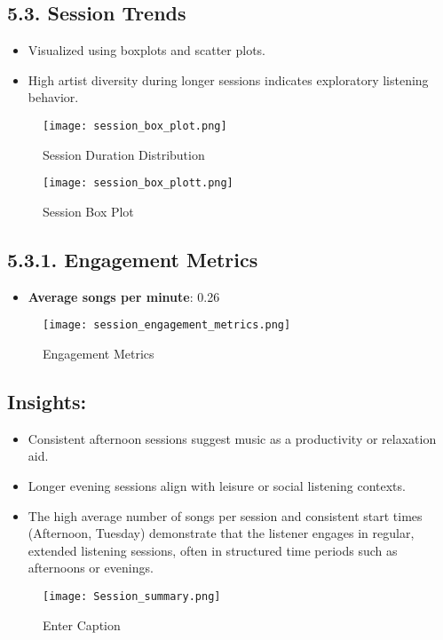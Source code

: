 \documentclass[12pt]{article}
\begin{document}
\begin{itemize}
\subsection*{5.3. Session Trends}
\begin{itemize}
    \item Visualized using boxplots and scatter plots.
    \item High artist diversity during longer sessions indicates exploratory listening behavior.
\end{itemize}
\begin{figure}[H]
    \centering
    \texttt{[image: session\_box\_plot.png]}
    \caption{Session Duration Distribution}
    \label{fig:enter-label}
\end{figure}
\begin{figure}[H]
    \centering
    \texttt{[image: session\_box\_plott.png]}
    \caption{Session Box Plot}
    \label{fig:enter-label}
\end{figure}

\subsection*{5.3.1. Engagement Metrics}
\begin{itemize}
    \item \textbf{Average songs per minute}: 0.26
\end{itemize}
\begin{figure}[H]
    \centering
    \texttt{[image: session\_engagement\_metrics.png]}
    \caption{Engagement Metrics}
    \label{fig:enter-label}
\end{figure}

\subsection*{Insights:}
\begin{itemize}
    \item Consistent afternoon sessions suggest music as a productivity or relaxation aid.
    \item Longer evening sessions align with leisure or social listening contexts.
    \item The high average number of songs per session and consistent start times (Afternoon, Tuesday) demonstrate that the listener engages in regular, extended listening sessions, often in structured time periods such as afternoons or evenings.
\end{itemize}
\begin{figure}[H]
    \centering
    \texttt{[image: Session\_summary.png]}
    \caption{Enter Caption}
    \label{fig:enter-label}
\end{figure}

\end{itemize}
\end{document}
